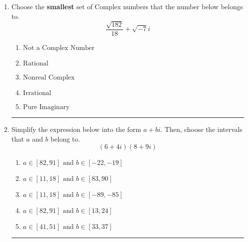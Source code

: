 \documentclass[14pt]{extbook}
\newcommand{\litem}[1]{\item#1\hspace*{-1cm}\rule{\textwidth}{0.4pt}}
\begin{document}
\begin{enumerate}
{\begin{enumerate}[label=\Alph*.]
\end{enumerate} }
\litem{
Choose the \textbf{smallest} set of Complex numbers that the number below belongs to.\[ \frac{\sqrt{182}}{18}+\sqrt{-7}i \]\begin{enumerate}[label=\Alph*.]
\item \( \text{Not a Complex Number} \)
\item \( \text{Rational} \)
\item \( \text{Nonreal Complex} \)
\item \( \text{Irrational} \)
\item \( \text{Pure Imaginary} \)

\end{enumerate} }
\litem{
Simplify the expression below into the form $a+bi$. Then, choose the intervals that $a$ and $b$ belong to.\[ (6 + 4 i)(8 + 9 i) \]\begin{enumerate}[label=\Alph*.]
\item \( a \in [82, 91] \text{ and } b \in [-22, -19] \)
\item \( a \in [11, 18] \text{ and } b \in [83, 90] \)
\item \( a \in [11, 18] \text{ and } b \in [-89, -85] \)
\item \( a \in [82, 91] \text{ and } b \in [13, 24] \)
\item \( a \in [41, 51] \text{ and } b \in [33, 37] \)

\end{enumerate} }
\end{enumerate}
\end{document}
